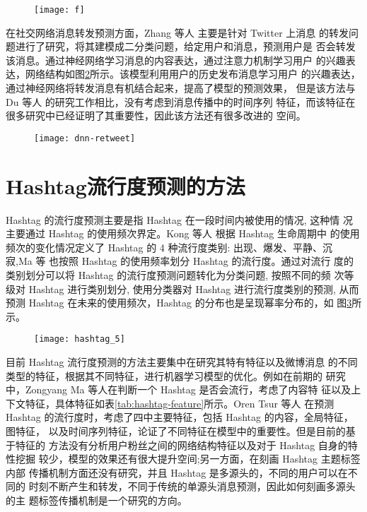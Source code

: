 \begin{figure}[H]
    \centering
    \texttt{[image: f]}
    \label{fig:f}
\end{figure}

在社交网络消息转发预测方面，Zhang 等人 \citep{Zhang2016Retweet}主要是针对 Twitter 上消息 的转发问题进行了研究，将其建模成二分类问题，给定用户和消息，预测用户是 否会转发该消息。通过神经网络学习消息的内容表达，通过注意力机制学习用户 的兴趣表达，网络结构如图\ref{fig:dnn-attention}所示。该模型利用用户的历史发布消息学习用户 的兴趣表达，通过神经网络将转发消息有机结合起来，提高了模型的预测效果， 但是该方法与 Du 等人 \citep{Du2016Recurrent}的研究工作相比，没有考虑到消息传播中的时间序列 特征，而该特征在很多研究中已经证明了其重要性，因此该方法还有很多改进的 空间。

\begin{figure}[H]
    \centering
    \texttt{[image: dnn-retweet]}
    \label{fig:dnn-attention}
\end{figure}

\section{Hashtag流行度预测的方法}

Hashtag 的流行度预测主要是指 Hashtag 在一段时间内被使用的情况, 这种情 况主要通过 Hashtag 的使用频次界定。Kong 等人 \citep{Kong2014Predicting}根据 Hashtag 生命周期中 的使用频次的变化情况定义了 Hashtag 的 4 种流行度类别: 出现、爆发、平静、沉 寂,Ma 等 \citep{Ma2012Will,Ma2013On} 也按照 Hashtag 的使用频率划分 Hashtag 的流行度。通过对流行 度的类别划分可以将 Hashtag 的流行度预测问题转化为分类问题, 按照不同的频 次等级对 Hashtag 进行类别划分, 使用分类器对 Hashtag 进行流行度类别的预测, 从而预测 Hashtag 在未来的使用频次，Hashtag 的分布也是呈现幂率分布的，如 图\ref{fig:g}所示。

\begin{figure}[H]
    \centering
    \texttt{[image: hashtag\_5]}
    \label{fig:g}
\end{figure}


目前 Hashtag 流行度预测的方法主要集中在研究其特有特征以及微博消息 的不同类型的特征，根据其不同特征，进行机器学习模型的优化。例如在前期的 研究中，Zongyang Ma 等人\citep{Ma2013On}在判断一个 Hashtag 是否会流行，考虑了内容特 征以及上下文特征，具体特征如表\ref{tab:hashtag-feature}所示。Oren Tsur 等人 \citep{tsur2012s}在预测 Hashtag 的流行度时，考虑了四中主要特征，包括 Hashtag 的内容，全局特征，图特征， 以及时间序列特征，论证了不同特征在模型中的重要性。但是目前的基于特征的 方法没有分析用户粉丝之间的网络结构特征以及对于 Hashtag 自身的特性挖掘 较少，模型的效果还有很大提升空间;另一方面，在刻画 Hashtag 主题标签内部 传播机制方面还没有研究，并且 Hashtag 是多源头的，不同的用户可以在不同的 时刻不断产生和转发，不同于传统的单源头消息预测，因此如何刻画多源头的主 题标签传播机制是一个研究的方向。

